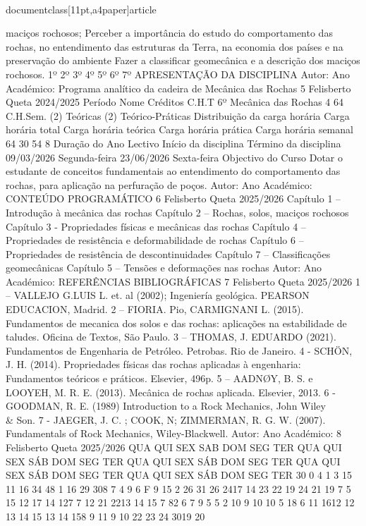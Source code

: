 \\documentclass[11pt,a4paper]{article}
\begin{document}
maciços rochosos; 
Perceber a importância do estudo do comportamento das rochas, no entendimento 
das estruturas da Terra, na economia dos países e na preservação do ambiente
Fazer a classificar geomecânica e a descrição dos maciços rochosos.
1º
2º
3º
4º
5º
6º
7º
APRESENTAÇÃO DA DISCIPLINA
Autor:
Ano Académico:
Programa analítico da cadeira de Mecânica das Rochas 5
Felisberto Queta
2024/2025
Período Nome Créditos C.H.T 
6º Mecânica das Rochas 4 64
C.H.Sem. (2) Teóricas (2) Teórico-Práticas 
Distribuição da carga horária
Carga horária total Carga horária teórica Carga horária prática Carga horária 
semanal 
64 30 54 8
Duração do Ano Lectivo
Início da disciplina Término da disciplina
09/03/2026 Segunda-feira 23/06/2026 Sexta-feira
Objectivo do Curso
Dotar o estudante de conceitos fundamentais ao entendimento do comportamento das
rochas, para aplicação na perfuração de poços.
Autor:
Ano Académico:
CONTEÚDO PROGRAMÁTICO 6
Felisberto Queta
2025/2026
Capítulo 1 – Introdução à mecânica das rochas 
Capítulo 2 – Rochas, solos, maciços rochosos
Capítulo 3 - Propriedades físicas e mecânicas das rochas 
Capítulo 4 – Propriedades de resistência e deformabilidade de rochas
Capítulo 6 – Propriedades de resistência de descontinuidades
Capítulo 7 – Classificações geomecânicas
Capítulo 5 – Tensões e deformações nas rochas
Autor:
Ano Académico:
REFERÊNCIAS BIBLIOGRÁFICAS 7
Felisberto Queta
2025/2026
1 – VALLEJO G.LUIS L. et. al (2002); Ingeniería geológica. PEARSON EDUCACION, Madrid.
2 – FIORIA. Pio, CARMIGNANI L. (2015). Fundamentos de mecanica dos solos e das rochas: 
aplicações na estabilidade de taludes. Oficina de Textos, São Paulo.
3 – THOMAS, J. EDUARDO (2021). Fundamentos de Engenharia de Petróleo. Petrobas. Rio de 
Janeiro.
4 - SCHÖN, J. H. (2014). Propriedades físicas das rochas aplicadas à engenharia: Fundamentos 
teóricos e práticos. Elsevier, 496p.
5 – AADNØY, B. S. e LOOYEH, M. R. E. (2013). Mecânica de rochas aplicada. Elsevier, 2013.
6 - GOODMAN, R. E. (1989) Introduction to a Rock Mechanics, John Wiley \\& Son.
7 - JAEGER, J. C. ; COOK, N; ZIMMERMAN, R. G. W. (2007). Fundamentals of Rock Mechanics, 
Wiley-Blackwell.
Autor:
Ano Académico:
8
Felisberto Queta
2025/2026
QUA QUI SEX SAB DOM SEG TER QUA QUI SEX SÁB DOM SEG TER QUA QUI SEX SÁB DOM SEG TER QUA QUI SEX SÁB DOM SEG TER QUA QUI SEX SÁB DOM SEG TER
30
0
4
1
3
15
11
16
34
48
1 16 29 308
7
4
9
6
F
9 15
2
26
31
26
2417
14
23
22
19
24
21
19
7
5
15
12
17
14
127
7
12 21 2213 14 15
7 82
6 7
9
5
5
2
10
9 10
10
5
18
6
11
1612
12 13 14 15
13 14 158 9 11
9 10 22 23 24
3019 20
\end{document}

